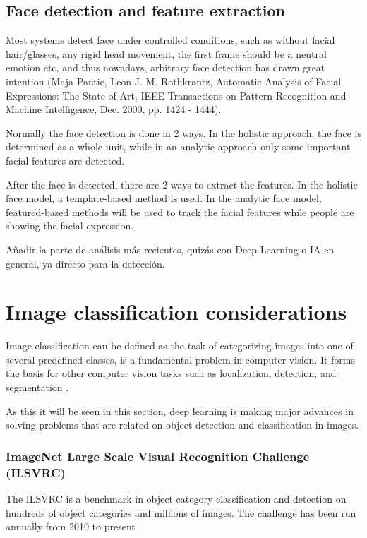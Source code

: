 \subsection{Face detection and feature extraction}

{\color{Orchid} Most systems detect face under controlled conditions, such as without facial
hair/glasses, any rigid head movement, the first frame should be a neutral emotion
etc, and thus nowadays, arbitrary face detection has drawn great intention
(Maja Pantic, Leon J. M. Rothkrantz, Automatic Analysis of Facial
Expressions: The State of Art, IEEE Transactions on Pattern Recognition
and Machine Intelligence, Dec. 2000, pp. 1424 - 1444).

Normally the face detection is done in 2 ways. In the holistic approach, the
face is determined as a whole unit, while in an analytic approach only some
important facial features are detected.

After the face is detected, there are 2 ways to extract the features. In the
holistic face model, a template-based method is used. In the analytic face model,
featured-based methods will be used to track the facial features while people are
showing the facial expression.}

{\color{JungleGreen} Añadir la parte de análisis más recientes, quizás con Deep
Learning o IA en general, ya directo para la detección.}


\section{Image classification considerations}

Image classification can be defined as the task of categorizing images
into one of several predefined classes, is a fundamental problem in computer
vision. It forms the basis for other computer vision tasks such as
localization, detection, and segmentation \citep{Karpathy2016}.

As this it will be seen in this section, deep learning is making major
advances in solving problems that are related on object detection and
classification in images.


\subsubsection{ImageNet Large Scale Visual Recognition Challenge (ILSVRC)}

The ILSVRC is a benchmark in object category classification and detection
on hundreds of object categories and millions of images. The challenge has
been run annually from 2010 to present \citep{Russakovsky2014}.

